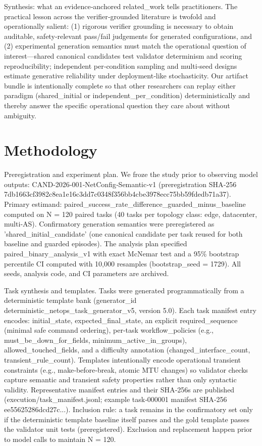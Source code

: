 \documentclass[conference]{IEEEtran}
\begin{document}
Synthesis: what an evidence‑anchored related\_work tells practitioners. The practical lesson across the verifier‑grounded literature is twofold and operationally salient: (1) rigorous verifier grounding is necessary to obtain auditable, safety‑relevant pass/fail judgements for generated configurations, and (2) experimental generation semantics must match the operational question of interest---shared canonical candidates test validator determinism and scoring reproducibility; independent per‑condition sampling and multi‑seed designs estimate generative reliability under deployment‑like stochasticity. Our artifact bundle is intentionally complete so that other researchers can replay either paradigm (shared\_initial or independent\_per\_condition) deterministically and thereby answer the specific operational question they care about without ambiguity.

\section{Methodology}
Preregistration and experiment plan. We froze the study prior to observing model outputs: CAND‑2026‑001‑NetConfig‑Semantic‑v1 (preregistration SHA‑256 7db1663cf3982c8ea1e16c3dd7c0348f356bb4cbe3978ecc75bb59fdedb71a37). Primary estimand: paired\_success\_rate\_difference\_guarded\_minus\_baseline computed on N = 120 paired tasks (40 tasks per topology class: edge, datacenter, multi‑AS). Confirmatory generation semantics were preregistered as 'shared\_initial\_candidate' (one canonical candidate per task reused for both baseline and guarded episodes). The analysis plan specified paired\_binary\_analysis\_v1 with exact McNemar test and a 95\% bootstrap percentile CI computed with 10,000 resamples (bootstrap\_seed = 1729). All seeds, analysis code, and CI parameters are archived.

Task synthesis and templates. Tasks were generated programmatically from a deterministic template bank (generator\_id deterministic\_netops\_task\_generator\_v5, version 5.0). Each task manifest entry encodes: initial\_state, expected\_final\_state, an explicit required\_sequence (minimal safe command ordering), per‑task workflow\_policies (e.g., must\_be\_down\_for\_fields, minimum\_active\_in\_groups), allowed\_touched\_fields, and a difficulty annotation (changed\_interface\_count, transient\_rule\_count). Templates intentionally encode operational transient constraints (e.g., make‑before‑break, atomic MTU changes) so validator checks capture semantic and transient safety properties rather than only syntactic validity. Representative manifest entries and their SHA‑256s are published (execution/task\_manifest.jsonl; example task‑000001 manifest SHA‑256 ee55625286dcd27c...). Inclusion rule: a task remains in the confirmatory set only if the deterministic template baseline itself parses and the gold template passes the validator unit tests (preregistered). Exclusion and replacement happen prior to model calls to maintain N = 120.
\end{document}
